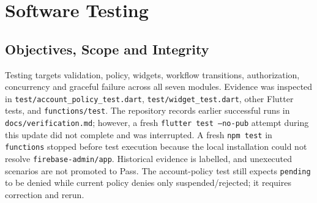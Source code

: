 \chapter{Software Testing}\label{ch:testing}
\section{Objectives, Scope and Integrity}
Testing targets validation, policy, widgets, workflow transitions, authorization, concurrency and graceful failure across all seven modules. Evidence was inspected in \texttt{test/account\_policy\_test.dart}, \texttt{test/widget\_test.dart}, other Flutter tests, and \texttt{functions/test}. The repository records earlier successful runs in \texttt{docs/verification.md}; however, a fresh \texttt{flutter test --no-pub} attempt during this update did not complete and was interrupted. A fresh \texttt{npm test} in \texttt{functions} stopped before test execution because the local installation could not resolve \texttt{firebase-admin/app}. Historical evidence is labelled, and unexecuted scenarios are not promoted to Pass. The account-policy test still expects \texttt{pending} to be denied while current policy denies only suspended/rejected; it requires correction and rerun.
